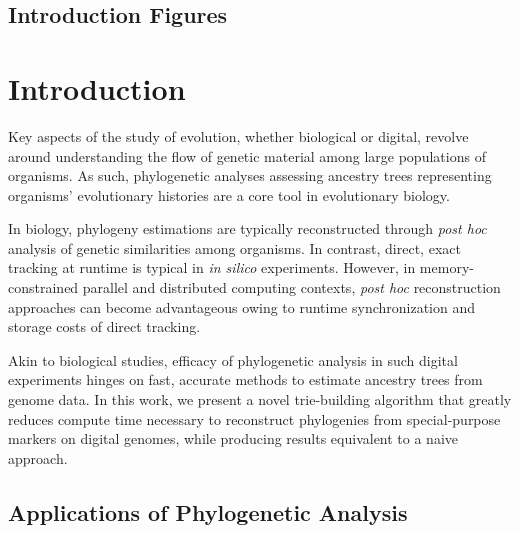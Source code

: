 \subsection{Introduction Figures}

\FloatBarrier









\section{Introduction} \label{sec:introduction}

Key aspects of the study of evolution, whether biological or digital, revolve around understanding the flow of genetic material among large populations of organisms.
As such, phylogenetic analyses assessing ancestry trees representing organisms' evolutionary histories are a core tool in evolutionary biology.

In biology, phylogeny estimations are typically reconstructed through \textit{post hoc} analysis of genetic similarities among organisms.
In contrast, direct, exact tracking at runtime is typical in \textit{in silico} experiments.
However, in memory-constrained parallel and distributed computing contexts, \textit{post hoc} reconstruction approaches can become advantageous owing to runtime synchronization and storage costs of direct tracking.

Akin to biological studies, efficacy of phylogenetic analysis in such digital experiments hinges on fast, accurate methods to estimate ancestry trees from genome data.
In this work, we present a novel trie-building algorithm that greatly reduces compute time necessary to reconstruct phylogenies from special-purpose markers on digital genomes, while producing results equivalent to a naive approach.

\subsection{Applications of Phylogenetic Analysis}


